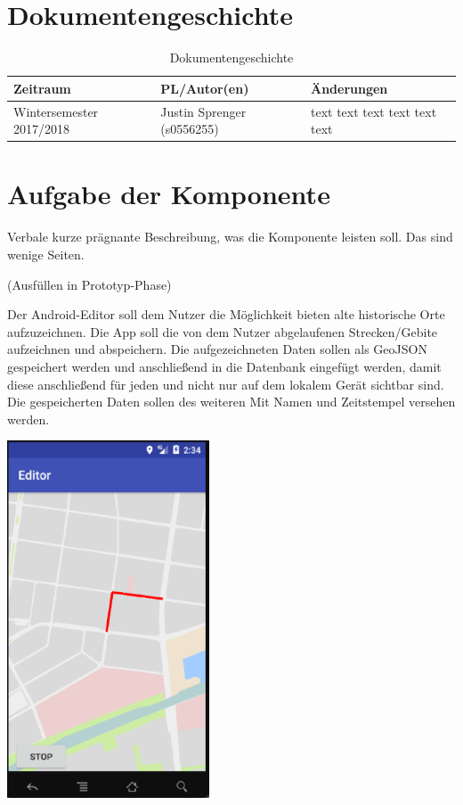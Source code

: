 \usepackage{url}
\section{Dokumentengeschichte}
\begin{table}[h]
 \begin{tabular}{|l|l|p{4cm}|}
 \hline
 Zeitraum & PL/Autor(en) & Änderungen \\
 \hline
 Wintersemester 2017/2018 & Justin Sprenger (s0556255) & 
text \newline 
text \newline 
text \newline 
text \newline 
text \newline 
text \newline 
 
  \\
 \hline
 \end{tabular}
 \caption{Dokumentengeschichte}
 \end{table}

\section{Aufgabe der Komponente}
Verbale kurze prägnante Beschreibung, was die Komponente leisten soll.
Das sind wenige Seiten.

(Ausfüllen in Prototyp-Phase)

Der Android-Editor soll dem Nutzer die Möglichkeit bieten alte historische Orte aufzuzeichnen. Die App soll die von dem Nutzer abgelaufenen Strecken/Gebite aufzeichnen und abspeichern. Die aufgezeichneten Daten sollen als GeoJSON gespeichert werden und anschließend in die Datenbank eingefügt werden, damit diese anschließend für jeden und nicht nur auf dem lokalem Gerät sichtbar sind. Die gespeicherten Daten sollen des weiteren Mit Namen und Zeitstempel versehen werden.

\includegraphics[width=0.45\textwidth]{AndroidEditorOV}

